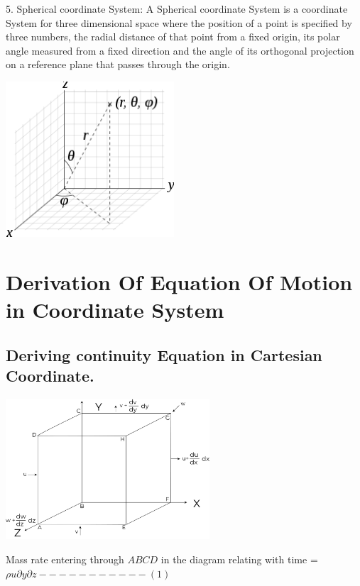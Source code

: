 \documentclass[a4paper, 12pt]{report}
\begin{document}
5. Spherical coordinate System:
A Spherical coordinate System is a  coordinate System  for three dimensional space where the position of a point is specified by three numbers, the radial distance of that point from a fixed origin, its polar angle measured from a fixed direction and the angle of its orthogonal projection on a reference plane that passes through the origin.
\begin{center}
	\includegraphics[width=0.47\textwidth]{spherical.png}
\end{center}


\pagebreak
\newpage

\chapter{Derivation Of Equation Of Motion in Coordinate System}
\section{Deriving continuity Equation in Cartesian Coordinate.}




\begin{center}
	\includegraphics[width=0.57\textwidth]{cube-label0}
	
\end{center}

Mass rate entering through $ABCD$ in the diagram relating with time = $\rho u\partial y \partial z -----------(1)$
\end{document}
